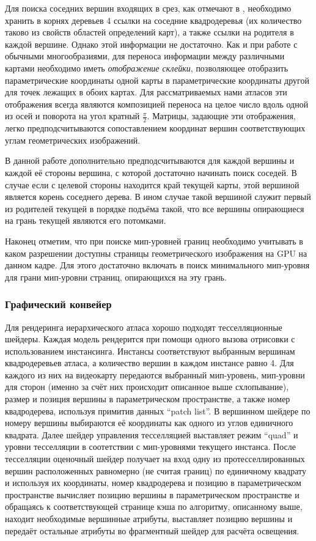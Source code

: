 Для поиска соседних вершин входящих в срез, как отмечают в \cite{niski2007multi}, необходимо хранить в корнях деревьев 4 ссылки на соседние квадродеревья (их количество таково из свойств областей определений карт), а также ссылки на родителя в каждой вершине. Однако этой информации не достаточно. Как и при работе с обычными многообразиями, для переноса информации между различными картами необходимо иметь \emph{отображение склейки}, позволяющее отобразить параметрические координаты одной карты в параметрические координаты другой для точек лежащих в обоих картах. Для рассматриваемых нами атласов эти отображения всегда являются композицией переноса на целое число вдоль одной из осей и поворота на угол кратный $\frac{\pi}{2}$. Матрицы, задающие эти отображения, легко предподсчитываются сопоставлением координат вершин соответствующих углам геометрических изображений.

В данной работе дополнительно предподсчитываются для каждой вершины и каждой её стороны вершина, с которой достаточно начинать поиск соседей. В случае если с целевой стороны находится край текущей карты, этой вершиной является корень соседнего дерева. В ином случае такой вершиной служит первый из родителей текущей в порядке подъёма такой, что все вершины опирающиеся на грань текущей являются его потомками.

Наконец отметим, что при поиске мип-уровней границ необходимо учитывать в каком разрешении доступны страницы геометрического изображения на GPU на данном кадре. Для этого достаточно включать в поиск минимального мип-уровня для грани мип-уровни страниц, опирающихся на эту грань.

\subsubsection{Графический конвейер}
Для рендеринга иерархического атласа хорошо подходят тесселляционные шейдеры. Каждая модель рендерится при помощи одного вызова отрисовки с использованием инстансинга. Инстансы соответствуют выбранным вершинам квадродеревьев атласа, а количество вершин в каждом инстансе равно 4. Для каждого из них на видеокарту передаются выбранный мип-уровень, мип-уровни для сторон (именно за счёт них происходит описанное выше схлопывание), размер и позиция вершины в параметрическом пространстве, а также номер квадродерева, используя примитив данных ``patch list''. В вершинном шейдере по номеру вершины выбираются её координаты как одного из углов единичного квадрата. Далее шейдер управления тесселляцией выставляет режим ``quad'' и уровни тесселляции в соотетствии с мип-уровнями текущего инстанса. После тесселляции оценочный шейдер получает на вход одну из протесселлированных вершин расположенных равномерно (не считая границ) по единичному квадрату и используя их координаты, номер квадродерева и позицию в параметрическом пространстве вычисляет позицию вершины в параметрическом пространстве и обращаясь к соответствующей странице кэша по алгоритму, описанному выше, находит необходимые вершинные атрибуты, выставляет позицию вершины и передаёт остальные атрибуты во фрагментный шейдер для расчёта освещения.

